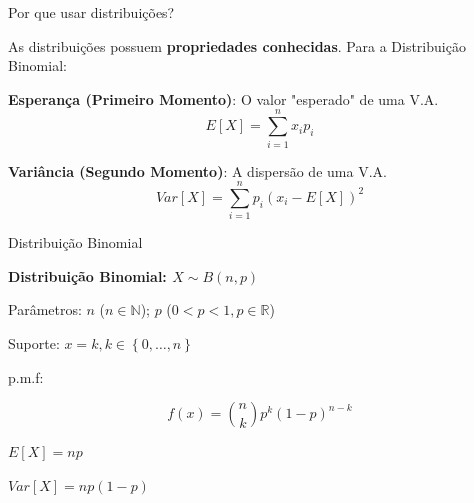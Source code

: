 \documentclass{beamer}\usepackage[]{graphicx}\usepackage[]{color}
\begin{document}
\begin{frame}{Por que usar distribuições?}

As distribuições possuem \textbf{propriedades conhecidas}. Para a Distribuição Binomial:

\vfill

\begin{small}

\textbf{Esperança (Primeiro Momento)}:
O valor "esperado" de uma V.A.
  \begin{equation*}
  E[X] = \sum_{i=1}^n{x_ip_i}
  \end{equation*}


\pause

\textbf{Variância (Segundo Momento)}:
A dispersão de uma V.A.
  \begin{equation*}
  Var[X] = \sum_{i=1}^n{p_i}(x_i - E[X])^2
  \end{equation*}


\end{small}

\end{frame} 


\begin{frame}{Distribuição Binomial}

\textbf{Distribuição Binomial: $X \sim B(n,p)$}

Parâmetros: $n$ ($n \in \mathbb{N}$); $p$ ($0 < p < 1, p \in \mathbb{R}$)

Suporte: $x = k, k \in \left\{0,\ldots,n\right\}$

p.m.f:

\begin{equation*}
    f(x) = \binom{n}{k}p^k(1-p)^{n-k}
  \end{equation*}

$E[X] = np$

$Var[X] = np(1 - p)$

\end{frame} 
\end{document}
